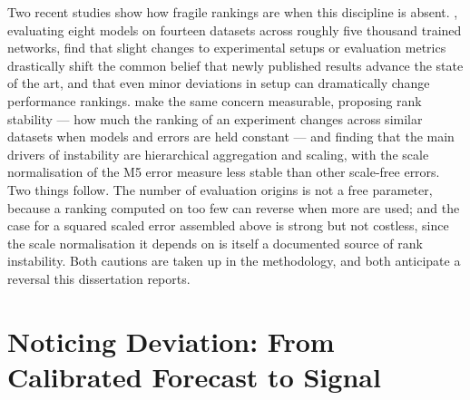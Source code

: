 Two recent studies show how fragile rankings are when this discipline is
absent. \citet{brigato_there_2025}, evaluating eight models on fourteen
datasets across roughly five thousand trained networks, find that slight
changes to experimental setups or evaluation metrics drastically shift the
common belief that newly published results advance the state of the art, and
that even minor deviations in setup can dramatically change performance
rankings. \citet{hewamalage_look_2021} make the same concern measurable,
proposing rank stability --- how much the ranking of an experiment changes
across similar datasets when models and errors are held constant --- and
finding that the main drivers of instability are hierarchical aggregation and
scaling, with the scale normalisation of the M5 error measure less stable than
other scale-free errors. Two things follow. The number of evaluation origins is
not a free parameter, because a ranking computed on too few can reverse when
more are used; and the case for a squared scaled error assembled above is
strong but not costless, since the scale normalisation it depends on is itself
a documented source of rank instability. Both cautions are taken up in the
methodology, and both anticipate a reversal this dissertation reports.

\section{Noticing Deviation: From Calibrated Forecast to Signal}
\label{sec:rw-deviation}

